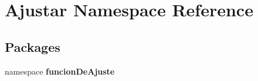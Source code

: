\section{\-Ajustar \-Namespace \-Reference}
\label{namespace_ajustar}
\subsection*{\-Packages}
\begin{DoxyCompactItemize}
\item 
namespace {\bf funcion\-De\-Ajuste}
\end{DoxyCompactItemize}
